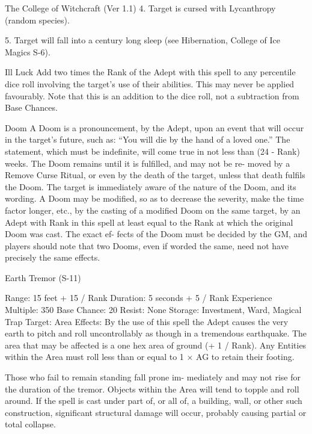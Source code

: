 \begin{Chapter}{The College of Witchcraft (Ver 1.1)}
4.  Target  is  cursed  with  Lycanthropy  (random 
species). 

5.  Target  will  fall  into  a  century  long  sleep  (see 
Hibernation, College of Ice Magics S-6). 

Ill Luck Add two times the Rank of the Adept with 
this  spell  to  any  percentile  dice  roll  involving  the 
target’s  use  of  their  abilities.  This  may  never  be 
applied favourably. Note that this is an addition to 
the dice roll, not a subtraction from Base Chances. 

Doom A Doom is a pronouncement, by the Adept, 
upon an event that will occur in the target’s future, 
such as: “You will die by the hand of a loved one.” 
The statement, which must be indefinite, will come 
true in not less than (24 - Rank) weeks. The Doom 
remains  until  it  is  fulfilled,  and  may  not  be  re-
moved  by  a  Remove  Curse  Ritual,  or  even  by  the 
death  of  the  target,  unless  that  death  fulfils  the 
Doom.  The  target  is  immediately  aware  of  the 
nature of the Doom, and its wording. A Doom may 
be  modified,  so  as  to  decrease  the  severity,  make 
the  time  factor  longer,  etc.,  by  the  casting  of  a 
modified  Doom  on  the  same  target,  by  an  Adept 
with Rank in this spell at least equal to the Rank at 
which  the  original  Doom  was  cast.  The  exact  ef-
fects of the Doom must be decided by the GM, and 
players  should  note  that  two  Dooms,  even  if 
worded the same, need not have precisely the same 
effects. 

Earth Tremor (S-11) 

Range: 15 feet + 15 / Rank 
Duration: 5 seconds + 5 / Rank 
Experience Multiple: 350 
Base Chance: 20%
Resist: None 
Storage: Investment, Ward, Magical Trap 
Target: Area 
Effects:  By  the  use  of  this  spell  the  Adept  causes 
the  very  earth  to  pitch  and  roll  uncontrollably  as 
though  in  a  tremendous  earthquake.  The  area  that 
may be affected is a one hex area of ground (+ 1 / 
Rank). Any Entities within the Area  must roll less 
than or equal to 1 × AG to retain their footing. 

Those  who  fail  to  remain  standing  fall  prone  im-
mediately  and may  not  rise  for  the  duration  of the 
tremor. Objects within the Area will tend to topple 
and roll around. If the spell is cast under part of, or 
all of, a building, wall,  or other such construction, 
significant  structural  damage  will  occur,  probably 
causing partial or total collapse. 


\end{Chapter}
